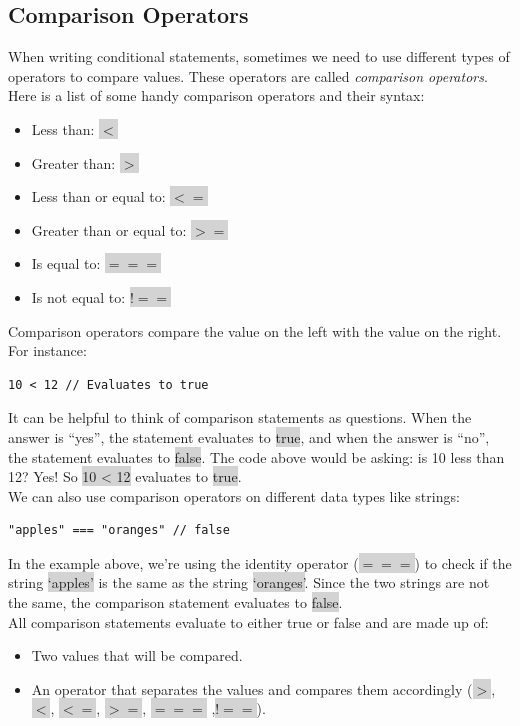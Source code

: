 \documentclass[11pt]{article}
\begin{document}
\subsection{Comparison Operators}
When writing conditional statements, sometimes we need to use different types of operators to compare values. These operators are called \textit{comparison operators}. Here is a list of some handy comparison operators and their syntax:
\begin{itemize}[leftmargin = *]
\item Less than: \colorbox{lightgray}{$<$}
\item Greater than: \colorbox{lightgray}{$>$}
\item Less than or equal to: \colorbox{lightgray}{$<$$=$}
\item Greater than or equal to: \colorbox{lightgray}{$>$$=$}
\item Is equal to: \colorbox{lightgray}{$=$$=$$=$}
\item Is not equal to: \colorbox{lightgray}{$!$$=$$=$}
\end{itemize}
Comparison operators compare the value on the left with the value on the right. For instance:
\begin{lstlisting}
10 < 12 // Evaluates to true
\end{lstlisting}
It can be helpful to think of comparison statements as questions. When the answer is “yes”, the statement evaluates to \colorbox{lightgray}{true}, and when the answer is “no”, the statement evaluates to \colorbox{lightgray}{false}. The code above would be asking: is 10 less than 12? Yes! So \colorbox{lightgray}{10 < 12} evaluates to \colorbox{lightgray}{true}. \\
\newline
We can also use comparison operators on different data types like strings:
\begin{lstlisting}
"apples" === "oranges" // false
\end{lstlisting}
In the example above, we’re using the identity operator (\colorbox{lightgray}{$=$$=$$=$}) to check if the string \colorbox{lightgray}{`apples'} is the same as the string \colorbox{lightgray}{`oranges'}. Since the two strings are not the same, the comparison statement evaluates to \colorbox{lightgray}{false}. \\
\newline
All comparison statements evaluate to either true or false and are made up of: 
\begin{itemize}[leftmargin = *]
\item Two values that will be compared.
\item An operator that separates the values and compares them accordingly (\colorbox{lightgray}{$>$}, \colorbox{lightgray}{$<$}, \colorbox{lightgray}{$<$$=$}, \colorbox{lightgray}{$>$$=$}, \colorbox{lightgray}{$=$$=$$=$} ,\colorbox{lightgray}{$!$$=$$=$}).
\end{itemize}
\end{document}
